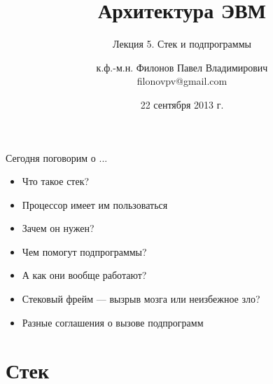 \documentclass[utf8, russian]{beamer}
\title{Архитектура ЭВМ}
\subtitle{Лекция 5. Стек и подпрограммы}
\author{к.ф.-м.н. Филонов Павел Владимирович \\ filonovpv@gmail.com}
\date{22 сентября 2013 г.}
\institute[МГТУ ГА] 
{
    Московский Государственный Технический Университет \\
    Гражданской Авиации
}
\begin{document}
    \frame{\titlepage}
    \begin{frame}{Сегодня поговорим о ...}
        \begin{itemize}
            \pause
            \item Что такое стек?
            \pause
            \item Процессор имеет им пользоваться
            \pause
            \item Зачем он нужен?
            \pause 
            \item Чем помогут подпрограммы?
            \pause
            \item А как они вообще работают?
            \pause
            \item Стековый фрейм --- вызрыв мозга или неизбежное зло?
            \pause
            \item Разные соглашения о вызове подпрограмм
        \end{itemize}
    \end{frame}
    \section{Стек}
\end{document}
